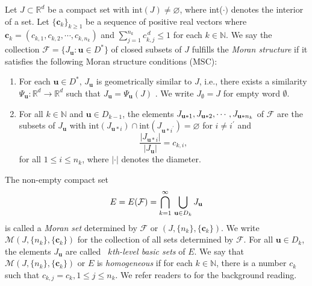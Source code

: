 \documentclass[12pt]{amsart}
\numberwithin{equation}{section}
\theoremstyle{plain}
\theoremstyle{remark}
\theoremstyle{definition}
\newcommand{\N}{\mathbb{N}}
\newcommand{\bu}{\mathbf{u}}
\newcommand{\ccc}{\mathbf{c}}
\renewcommand{\le}{\leqslant}
\renewcommand{\geq}{\geqslant}
\renewcommand{\leq}{\leqslant}
\begin{document}
	Let $
	J\subset \mathbb{R}^{d}$ be a compact set with $\mbox{int}(J)\neq
	\varnothing $, where int($\cdot )$ denotes the interior of a set. Let $
	\{\ccc_{k}\}_{k\geq 1}$ be a sequence of positive real vectors where $\ccc
	_{k}=(c_{k,1},c_{k,2},\cdots ,c_{k,n_{k}})$ and $\sum
	_{j=1}^{n_{k}}c_{k,j}^{\,d}\leq 1$ for each $k\in \mathbb{N}$. We say the
	collection $\mathcal{F}=\{J_{\bu}:\bu\in D^*\}$ of closed
	subsets of $J$ fulfills the \textit{Moran structure} if it satisfies the
	following Moran structure conditions (MSC):
	\begin{enumerate}
		
		\item For each $\bu\in D^*$, $J_{\bu}$ is geometrically similar to
		$J$, i.e., there exists a similarity $\Psi_{\bu}:\mathbb{R}%
		^{d}\rightarrow \mathbb{R}^{d}$ such that $J_{\bu}=\Psi_{\bu}(J)$%
		. We write $J_{\emptyset }=J$ for empty word $\emptyset $.
		\item For all $k\in \mathbb{N}$ and $\bu\in D_{k-1}$, the elements $J_{%
			\bu*1}, J_{\bu*2},\cdots ,J_{\bu*n_{k}}$ of $\mathcal{F}$
		are the subsets of $J_{\bu}$ with   $\mbox{int}%
		(J_{\bu*i})\cap \mbox{int}(J_{\bu*i^{\prime }})=\varnothing $
		for $i\neq i^{\prime }$ and 
		\begin{equation*}
			\frac{|J_{\bu*i}|}{|J_{\bu}|}=c_{k,i},
		\end{equation*}%
		for all $1\leq i\leq n_{k} $,		where $|\cdot |$ denotes the diameter.
		
	\end{enumerate}
	The non-empty compact set
	\begin{equation}\label{attractor}
		E=E(\mathcal{F})=\bigcap_{k=1}^{\infty }\,\bigcup_{%
			\bu\in D_{k}}J_{\bu}
	\end{equation}
	is called a \textit{Moran set} determined by $\mathcal{F}$ or $(J,\{n_k\},\{\ccc_k\})$. We write $\mathcal{M}(J,\{n_k\},\{\ccc_k\})$ for the collection of all sets determined by $\mathcal{F}$. For all $\bu\in D_{k}$, the elements $J_{\bu}$
	are called \textit{\ $k$th-level basic sets} of $E$.   We say that $\mathcal{M}(J,\{n_k\},\{\ccc_k\})$ or $E$ is \emph{homogeneous} if for each $k\in \N$, there is a number $c_k$ such that $c_{k,j}=c_k, 1\le j\le n_k$. We refer readers to \cite{Wen2000} for the background reading.
	
\end{document}
